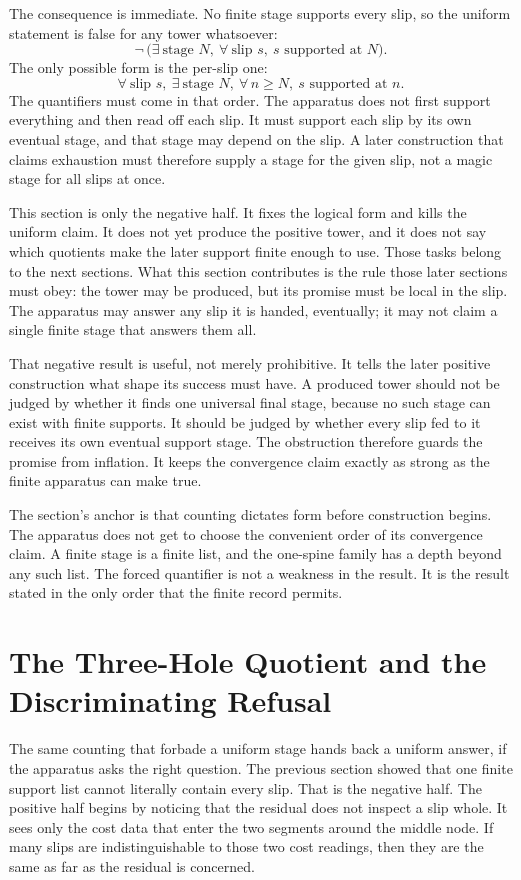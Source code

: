 The consequence is immediate. No finite stage supports every slip, so the uniform
statement is false for any tower whatsoever:
\[
  \neg\,\big(\exists\ \text{stage } N,\ \forall\ \text{slip } s,\ 
  s \text{ supported at } N\big).
\]
The only possible form is the per-slip one:
\[
  \forall\ \text{slip } s,\ \exists\ \text{stage } N,\ \forall\, n \ge N,\ 
  s \text{ supported at } n .
\]
The quantifiers must come in that order. The apparatus does not first support
everything and then read off each slip. It must support each slip by its own
eventual stage, and that stage may depend on the slip. A later construction that
claims exhaustion must therefore supply a stage for the given slip, not a magic
stage for all slips at once.

This section is only the negative half. It fixes the logical form and kills the
uniform claim. It does not yet produce the positive tower, and it does not say which
quotients make the later support finite enough to use. Those tasks belong to the
next sections. What this section contributes is the rule those later sections must
obey: the tower may be produced, but its promise must be local in the slip. The
apparatus may answer any slip it is handed, eventually; it may not claim a single
finite stage that answers them all.

That negative result is useful, not merely prohibitive. It tells the later
positive construction what shape its success must have. A produced tower should
not be judged by whether it finds one universal final stage, because no such
stage can exist with finite supports. It should be judged by whether every slip
fed to it receives its own eventual support stage. The obstruction therefore
guards the promise from inflation. It keeps the convergence claim exactly as
strong as the finite apparatus can make true.

The section's anchor is that counting dictates form before construction begins.
The apparatus does not get to choose the convenient order of its convergence
claim. A finite stage is a finite list, and the one-spine family has a depth
beyond any such list. The forced quantifier is not a weakness in the result. It is
the result stated in the only order that the finite record permits.

\section{The Three-Hole Quotient and the Discriminating Refusal}

The same counting that forbade a uniform stage hands back a uniform answer, if
the apparatus asks the right question. The previous section showed that one
finite support list cannot literally contain every slip. That is the negative
half. The positive half begins by noticing that the residual does not inspect a
slip whole. It sees only the cost data that enter the two segments around the
middle node. If many slips are indistinguishable to those two cost readings, then
they are the same as far as the residual is concerned.

